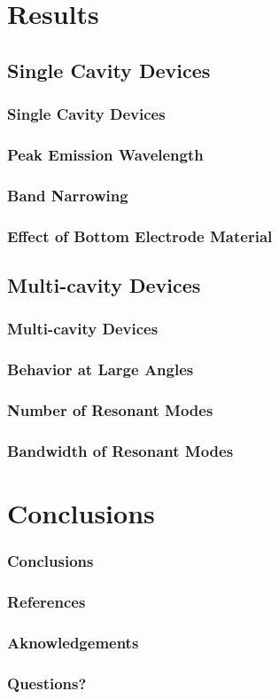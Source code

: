 \documentclass{beamer}
\begin{document}
\section{Results}
    \frame{\tableofcontents[currentsection]}
    
    \subsection{Single Cavity Devices}
        \begin{frame}
            \frametitle{Single Cavity Devices}
        \end{frame}
        \begin{frame}
            \frametitle{Peak Emission Wavelength}
        \end{frame}
        \begin{frame}
            \frametitle{Band Narrowing}
        \end{frame}
        \begin{frame}
            \frametitle{Effect of Bottom Electrode Material}
        \end{frame}
        
    \subsection{Multi-cavity Devices}
        \begin{frame}
            \frametitle{Multi-cavity Devices}
        \end{frame}
        \begin{frame}
            \frametitle{Behavior at Large Angles}
        \end{frame}
        \begin{frame}
            \frametitle{Number of Resonant Modes}
        \end{frame}
        \begin{frame}
            \frametitle{Bandwidth of Resonant Modes}
        \end{frame}
        
\section{Conclusions}
    \frame{\tableofcontents[currentsection]}
    \begin{frame}
        \frametitle{Conclusions}
    \end{frame}
    \begin{frame}
        \frametitle{References}
    \end{frame}
    \begin{frame}
        \frametitle{Aknowledgements}
    \end{frame}
    \begin{frame}
        \frametitle{Questions?}
    \end{frame}
    
\end{document}
